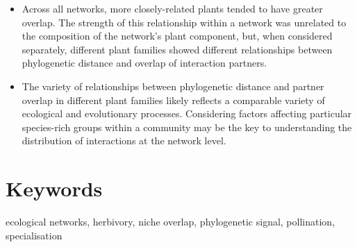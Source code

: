 \documentclass[12pt]{article}
\begin{document}
\begin{spacing}{1.0}
\begin{itemize}
    \item Across all networks, more closely-related plants tended to have greater overlap. The strength of this relationship within a network was unrelated to the composition of the network's plant component, but, when considered separately, different plant families showed different relationships between phylogenetic distance and overlap of interaction partners.

    \item The variety of relationships between phylogenetic distance and partner overlap in different plant families likely reflects a comparable variety of ecological and evolutionary processes. Considering factors affecting particular species-rich groups within a community may be the key to understanding the distribution of interactions at the network level.

  \end{itemize}


\section*{Keywords}

ecological networks, herbivory, niche overlap, phylogenetic signal, pollination, specialisation

\end{spacing}
\end{document}
